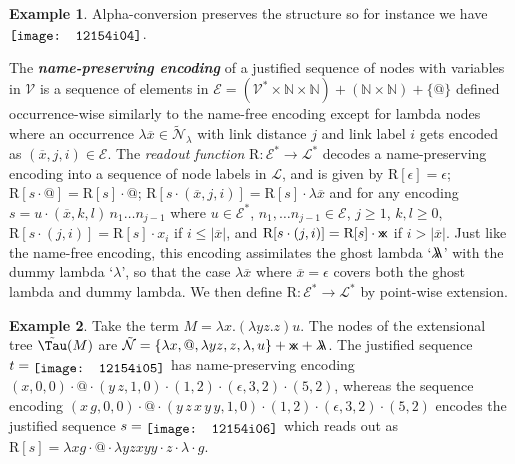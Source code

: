 \documentclass[xchauthor,chkrefs,GCNS,amsmath,amsthm,rotating,leaveRGB]{tcsg}
\renewcommand{\index}[1]{}
\theoremstyle{plain}
\theoremstyle{definition}
\newtheorem{example}{Example}[section]
\newcommand{\VarSet}{\mathcal{V}}
\newcommand{\Nodes}{\mathcal{N}}
\newcommand{\ExtendedNodes}{\tilde{\Nodes}}
\newcommand{\ExtendedNodesLmd}{\tilde{\Nodes}_{\lambda}}
\def\readout{\mathrm{R}}
\def\nameencoding{\mathcal{E}}
\newcommand{\ghostlmd}{{\lambda\mkern-7mu \lambda}}
\newcommand{\ghostvar}{\mathsf{x\mkern-5mu x}}
\newcommand{\exttree}{\tilde{\Tau}}
\begin{document}
\begin{example}
Alpha-conversion preserves the structure so for instance we have
$\raisebox{-1pt}{\texttt{[image: 12154i04]}}$.
\end{example}

The \textbf{\emph{name-preserving encoding}}\index{name-preserving encoding}
of a justified sequence of nodes with variables in $\VarSet $ is a sequence
of elements in $\nameencoding = (\mathcal{V}^{*}\times \mathbb {N}\times
\mathbb {N}) + (\mathbb {N}\times \mathbb {N}) + \{ @ \}$  defined
occurrence-wise similarly to the name-free encoding except for lambda nodes
where an occurrence $\lambda \overline{x}\in \ExtendedNodesLmd $ with link
distance $j$ and link label $i$ gets encoded as $(\overline{x},j,i) \in
\mathcal{E}$. The \emph{readout function} $\readout : \nameencoding ^{*}
\rightarrow \mathcal{L}^{*}$ decodes a name-preserving encoding into a
sequence of node labels in $\mathcal{L}$, and is given by $\readout [\epsilon
]= \epsilon $; $\readout [s \cdot @] = \readout [s] \cdot @$; $\readout [s
\cdot (\overline{x}, j, i) ] = \readout [s] \cdot \lambda \overline{x}$ and
for any encoding $s = u \cdot (\overline{x}, k, l)\,  n_{1} \ldots n_{j-1}$
where $u \in \nameencoding ^{*}$, $n_{1}, \ldots n_{j-1}\in \nameencoding $,
$j\geq 1$, $k,l\geq 0$, $\readout [s\cdot (j,i)] = \readout [s] \cdot x_{i}$
if $i\leq |\overline{x}|$, and $\readout [s\cdot (j,i)]  = \readout [s] \cdot
\ghostvar $ if $i> |\overline{x}|$. Just like the name-free encoding, this
encoding assimilates the ghost lambda `$\ghostlmd $' with the dummy lambda
`$\lambda $', so that the case $\lambda \overline{x}$ where
$\overline{x}=\epsilon $ covers both the ghost lambda and dummy lambda. We
then define $\readout \colon \nameencoding ^{*} \rightarrow \mathcal{L}^{*}$
by point-wise extension.

\begin{example}\label{examp:ghost_materialization}
Take the term $M = \lambda x. (\lambda y z.z) u$. The nodes of the
extensional tree $\exttree (M)$ are $\ExtendedNodes = \{ \lambda x, @,
\lambda y z, z, \lambda , u \} + \ghostvar + \ghostlmd $. The justified
sequence $t = \raisebox{-2pt}{\texttt{[image: 12154i05]}} $ has name-preserving encoding $(x
,0,0)\cdot @\cdot (y\, z, 1,0)\cdot (1,2)\cdot (\epsilon ,3,2)\cdot (5,2)$,
whereas the sequence encoding $ (x\, g, 0, 0)\cdot @\cdot (y\, z\, x\, y\, y,
1,0)\cdot (1,2)\cdot (\epsilon ,3,2) \cdot (5,2)$ encodes the justified
sequence $s= \raisebox{-2pt}{\texttt{[image: 12154i06]}} $ which reads out as $\readout [s]=
\lambda x g \cdot @ \cdot \lambda y z x y y \cdot z \cdot \lambda \cdot g$.
\end{example}
\end{document}
